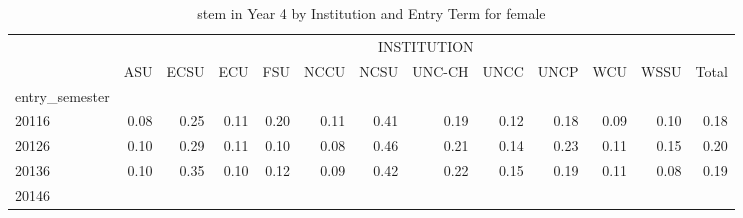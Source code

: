 \begin{table}[!h]
\caption{stem in Year 4 by Institution and Entry Term for female}
\centering
\begin{tabular}{lllllllllllll}
\cline{1-13}
\multicolumn{1}{c}{} &
  \multicolumn{12}{|c}{INSTITUTION} \\
\multicolumn{1}{c}{} &
  \multicolumn{1}{|r}{ASU} &
  \multicolumn{1}{r}{ECSU} &
  \multicolumn{1}{r}{ECU} &
  \multicolumn{1}{r}{FSU} &
  \multicolumn{1}{r}{NCCU} &
  \multicolumn{1}{r}{NCSU} &
  \multicolumn{1}{r}{UNC-CH} &
  \multicolumn{1}{r}{UNCC} &
  \multicolumn{1}{r}{UNCP} &
  \multicolumn{1}{r}{WCU} &
  \multicolumn{1}{r}{WSSU} &
  \multicolumn{1}{r}{Total} \\
\cline{1-13}
\multicolumn{1}{l}{entry\_semester} &
  \multicolumn{1}{|r}{} &
  \multicolumn{1}{r}{} &
  \multicolumn{1}{r}{} &
  \multicolumn{1}{r}{} &
  \multicolumn{1}{r}{} &
  \multicolumn{1}{r}{} &
  \multicolumn{1}{r}{} &
  \multicolumn{1}{r}{} &
  \multicolumn{1}{r}{} &
  \multicolumn{1}{r}{} &
  \multicolumn{1}{r}{} &
  \multicolumn{1}{r}{} \\
\multicolumn{1}{l}{\hspace{1em}20116} &
  \multicolumn{1}{|r}{0.08} &
  \multicolumn{1}{r}{0.25} &
  \multicolumn{1}{r}{0.11} &
  \multicolumn{1}{r}{0.20} &
  \multicolumn{1}{r}{0.11} &
  \multicolumn{1}{r}{0.41} &
  \multicolumn{1}{r}{0.19} &
  \multicolumn{1}{r}{0.12} &
  \multicolumn{1}{r}{0.18} &
  \multicolumn{1}{r}{0.09} &
  \multicolumn{1}{r}{0.10} &
  \multicolumn{1}{r}{0.18} \\
\multicolumn{1}{l}{\hspace{1em}20126} &
  \multicolumn{1}{|r}{0.10} &
  \multicolumn{1}{r}{0.29} &
  \multicolumn{1}{r}{0.11} &
  \multicolumn{1}{r}{0.10} &
  \multicolumn{1}{r}{0.08} &
  \multicolumn{1}{r}{0.46} &
  \multicolumn{1}{r}{0.21} &
  \multicolumn{1}{r}{0.14} &
  \multicolumn{1}{r}{0.23} &
  \multicolumn{1}{r}{0.11} &
  \multicolumn{1}{r}{0.15} &
  \multicolumn{1}{r}{0.20} \\
\multicolumn{1}{l}{\hspace{1em}20136} &
  \multicolumn{1}{|r}{0.10} &
  \multicolumn{1}{r}{0.35} &
  \multicolumn{1}{r}{0.10} &
  \multicolumn{1}{r}{0.12} &
  \multicolumn{1}{r}{0.09} &
  \multicolumn{1}{r}{0.42} &
  \multicolumn{1}{r}{0.22} &
  \multicolumn{1}{r}{0.15} &
  \multicolumn{1}{r}{0.19} &
  \multicolumn{1}{r}{0.11} &
  \multicolumn{1}{r}{0.08} &
  \multicolumn{1}{r}{0.19} \\
\multicolumn{1}{l}{\hspace{1em}20146} &

\end{tabular}
\end{table}
